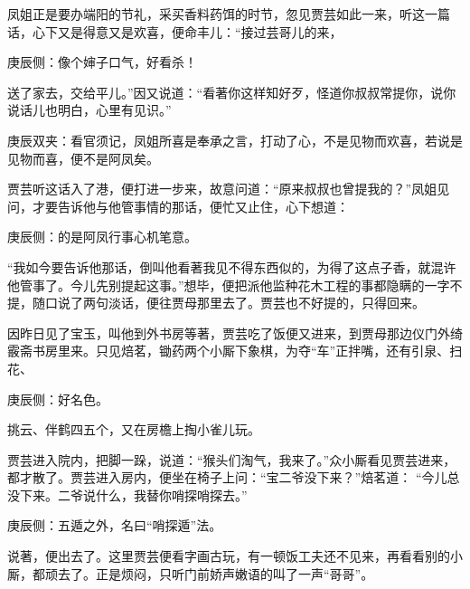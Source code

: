 \begin{parag}
    凤姐正是要办端阳的节礼，采买香料药饵的时节，忽见贾芸如此一来，听这一篇话，心下又是得意又是欢喜，便命丰儿：“接过芸哥儿的来，\begin{note}庚辰侧：像个婶子口气，好看杀！\end{note}送了家去，交给平儿。”因又说道：“看著你这样知好歹，怪道你叔叔常提你，说你说话儿也明白，心里有见识。”\begin{note}庚辰双夹：看官须记，凤姐所喜是奉承之言，打动了心，不是见物而欢喜，若说是见物而喜，便不是阿凤矣。\end{note}贾芸听这话入了港，便打进一步来，故意问道：“原来叔叔也曾提我的？”凤姐见问，才要告诉他与他管事情的那话，便忙又止住，心下想道：\begin{note}庚辰侧：的是阿凤行事心机笔意。\end{note}“我如今要告诉他那话，倒叫他看著我见不得东西似的，为得了这点子香，就混许他管事了。今儿先别提起这事。”想毕，便把派他监种花木工程的事都隐瞒的一字不提，随口说了两句淡话，便往贾母那里去了。贾芸也不好提的，只得回来。
\end{parag}


\begin{parag}
    因昨日见了宝玉，叫他到外书房等著，贾芸吃了饭便又进来，到贾母那边仪门外绮霰斋书房里来。只见焙茗，锄药两个小厮下象棋，为夺“车”正拌嘴，还有引泉、扫花、\begin{note}庚辰侧：好名色。\end{note}挑云、伴鹤四五个，又在房檐上掏小雀儿玩。
\end{parag}


\begin{parag}
    贾芸进入院内，把脚一跺，说道：“猴头们淘气，我来了。”众小厮看见贾芸进来，都才散了。贾芸进入房内，便坐在椅子上问：“宝二爷没下来？”焙茗道： “今儿总没下来。二爷说什么，我替你哨探哨探去。”\begin{note}庚辰侧：五遁之外，名曰“哨探遁”法。\end{note}说著，便出去了。这里贾芸便看字画古玩，有一顿饭工夫还不见来，再看看别的小厮，都顽去了。正是烦闷，只听门前娇声嫩语的叫了一声“哥哥”。
\end{parag}


